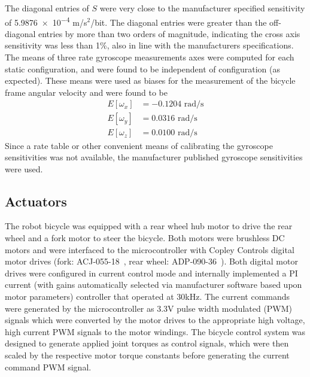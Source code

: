 The diagonal entries of $S$ were very close to the manufacturer specified
sensitivity of \num{5.9876e-4} m/s$^2$/bit. The diagonal entries were greater than
the off-diagonal entries by more than two orders of magnitude, indicating the
cross axis sensitivity was less than 1\%, also in line with the manufacturers
specifications. The means of three rate gyroscope measurements axes were
computed for each static configuration, and were found to be independent of
configuration (as expected). These means were used as biases for the
measurement of the bicycle frame angular velocity and were found to be
\begin{align}
  E[\omega_x] &= -0.1204\text{ rad/s}\\
  E[\omega_y] &=  0.0316 \text{ rad/s}\\
  E[\omega_z] &=  0.0100 \text{ rad/s}
\end{align}
Since a rate table or other convenient means of calibrating the gyroscope
sensitivities was not available, the manufacturer published gyroscope
sensitivities were used.

\subsection{Actuators} \label{rb:subsec:actuators}
The robot bicycle was equipped with a rear wheel hub motor to drive the rear
wheel and a fork motor to steer the bicycle. Both motors were brushless DC
motors and were interfaced to the microcontroller with Copley Controls digital
motor drives (fork: ACJ-055-18~\cite{CopleyACJ}, rear wheel:
ADP-090-36~\cite{CopleyADP}). Both digital motor drives were configured in
current control mode and internally implemented a PI current (with gains
automatically selected via manufacturer software based upon motor parameters)
controller that operated at 30kHz. The current commands were generated by the
microcontroller as 3.3V pulse width modulated (PWM) signals which were
converted by the motor drives to the appropriate high voltage, high current PWM
signals to the motor windings. The bicycle control system was designed to
generate applied joint torques as control signals, which were then scaled by
the respective motor torque constants before generating the current command PWM
signal.

